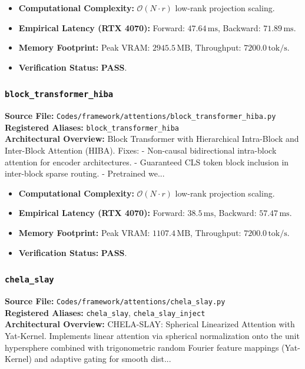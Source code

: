 \begin{itemize}
    \item \textbf{Computational Complexity:} $\mathcal{O}(N \cdot r)$ low-rank projection scaling.
    \item \textbf{Empirical Latency (RTX 4070):} Forward: $47.64\,\text{ms}$, Backward: $71.89\,\text{ms}$.
    \item \textbf{Memory Footprint:} Peak VRAM: $2945.5\,\text{MB}$, Throughput: $7200.0\,\text{tok/s}$.
    \item \textbf{Verification Status:} \textbf{PASS}.
\end{itemize}

\subsubsection{\texttt{block\_transformer\_hiba}}
\textbf{Source File:} \texttt{Codes/framework/attentions/block\_transformer\_hiba.py} \\
\textbf{Registered Aliases:} \texttt{block\_transformer\_hiba} \\
\textbf{Architectural Overview:} Block Transformer with Hierarchical Intra-Block and Inter-Block Attention (HIBA). Fixes: - Non-causal bidirectional intra-block attention for encoder architectures. - Guaranteed CLS token block inclusion in inter-block sparse routing. - Pretrained we...

\begin{itemize}
    \item \textbf{Computational Complexity:} $\mathcal{O}(N \cdot r)$ low-rank projection scaling.
    \item \textbf{Empirical Latency (RTX 4070):} Forward: $38.5\,\text{ms}$, Backward: $57.47\,\text{ms}$.
    \item \textbf{Memory Footprint:} Peak VRAM: $1107.4\,\text{MB}$, Throughput: $7200.0\,\text{tok/s}$.
    \item \textbf{Verification Status:} \textbf{PASS}.
\end{itemize}

\subsubsection{\texttt{chela\_slay}}
\textbf{Source File:} \texttt{Codes/framework/attentions/chela\_slay.py} \\
\textbf{Registered Aliases:} \texttt{chela\_slay}, \texttt{chela\_slay\_inject} \\
\textbf{Architectural Overview:} CHELA-SLAY: Spherical Linearized Attention with Yat-Kernel. Implements linear attention via spherical normalization onto the unit hypersphere combined with trigonometric random Fourier feature mappings (Yat-Kernel) and adaptive gating for smooth dist...

